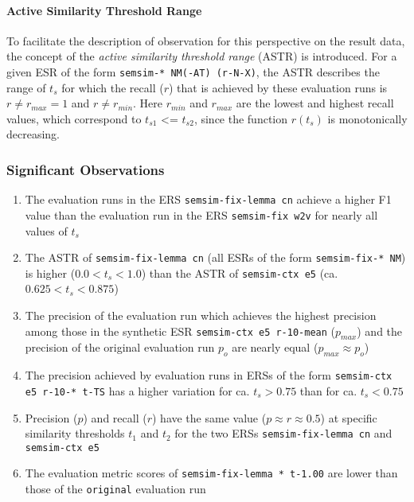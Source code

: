 \documentclass[11pt]{scrreprt}
\begin{document}

\paragraph{Active Similarity Threshold Range}
To facilitate the description of observation for this perspective on the result data, the concept of the \textit{active similarity threshold range} (ASTR) is introduced. For a given ESR of the form \texttt{semsim-* NM(-AT) (r-N-X)}, the ASTR describes the range of \(t_s\) for which the recall (\(r\)) that is achieved by these evaluation runs is \(r \neq r_{max} = 1 \) and \(r \neq r_{min}\). Here \(r_{min}\) and \(r_{max}\) are the lowest and highest recall values, which correspond to \(t_{s1}\) <= \(t_{s2}\), since the function \(r(t_s)\) is monotonically decreasing.


\subsubsection{Significant Observations}
\begin{enumerate}
	\item The evaluation runs in the ERS \texttt{semsim-fix-lemma cn} achieve a higher F1 value than the evaluation run in the ERS \texttt{semsim-fix w2v} for nearly all values of \(t_s\)
	\item The ASTR of \texttt{semsim-fix-lemma cn} (all ESRs of the form \texttt{semsim-fix-* NM}) is higher (\(0.0 < t_s < 1.0\)) than the ASTR of \texttt{semsim-ctx e5} (ca. \(0.625 < t_s < 0.875\))
	\item The precision of the evaluation run which achieves the highest precision among those in the synthetic ESR \texttt{semsim-ctx e5 r-10-mean} (\(p_{max}\)) and the precision of the original evaluation run \(p_o\) are nearly equal (\(p_{max} \approx p_o\))
	\item The precision achieved by evaluation runs in ERSs of the form \texttt{semsim-ctx e5 r-10-* t-TS} has a higher variation for ca. \(t_s > 0.75\) than for ca. \(t_s < 0.75\)
	\item Precision (\(p\)) and recall (\(r\)) have the same value (\(p \approx r \approx 0.5\)) at specific similarity thresholds \(t_1\) and \(t_2\) for the two ERSs \texttt{semsim-fix-lemma cn} and \texttt{semsim-ctx e5}
	\item The evaluation metric scores of \texttt{semsim-fix-lemma * t-1.00} are lower than those of the \texttt{original} evaluation run
\end{enumerate}
 
\end{document}
